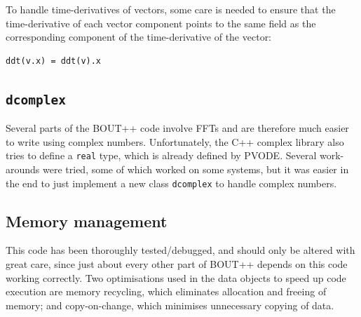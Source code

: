 \documentclass[12pt]{article}
\newcommand{\code}[1]{\texttt{#1}}
\begin{document}
To handle time-derivatives of vectors, some care is needed to ensure that
the time-derivative of each vector component points to the same
field as the corresponding component of the time-derivative of the vector:
\begin{lstlisting}
ddt(v.x) = ddt(v).x
\end{lstlisting}

\subsection{\code{dcomplex}}
Several parts of the BOUT++ code involve FFTs and are therefore much easier to
write using complex numbers. Unfortunately, the C++ complex library also tries
to define a \code{real} type, which is already defined by PVODE. Several
work-arounds were tried, some of which worked on some systems, but
it was easier in the end to just implement a new class \code{dcomplex} to
handle complex numbers.

\subsection{Memory management}
\label{sec:memorymanage}

This code has been thoroughly tested/debugged, and should only be altered
with great care, since just about every other part of BOUT++ depends on this code
working correctly. Two optimisations used in the data objects to speed up code execution
are memory recycling, which eliminates allocation and freeing of memory; and copy-on-change,
which minimises unnecessary copying of data.
\end{document}
